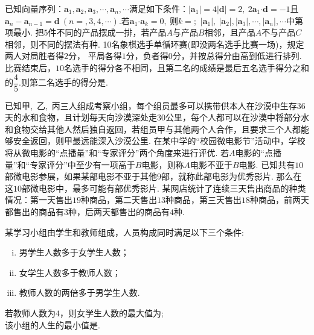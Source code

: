 \documentclass{BHCexam}
\begin{document}
\begin{questions}
\qs 已知向量序列：$ \bm{a}_1,\bm{a}_2,\bm{a}_3,\cdots,\bm{a}_n,\cdots $满足如下条件：$ \left|\bm{a}_1\right|=4\left|\bm{d}\right|=2,~2\bm{a}_1\bm\cdot \bm{d}=-1 $且$ \bm{a}_n-\bm{a}_{n-1}=
\bm{d}~(n=,3,4,\cdots). $若$ \bm{a}_1\bm{\cdot}\bm{a}_k=0,~ $则$ k= $\tk;~$ \left|\bm{a}_1\right|,~  \left|\bm{a}_2\right|, \left|\bm{a}_3\right|,\cdots, \left|\bm{a}_n\right|,\cdots$中第\tk 项最小.
\qs 把$ 5 $件不同的产品摆成一排，若产品$ A $与产品$ B $相邻，且产品$ A $不与产品$ C $相邻，则不同的摆法有\tk 种.
\qs 10名象棋选手单循环赛(即没两名选手比赛一场)，规定两人对局胜者得$ 2 $分， 平局各得$ 1 $分，负者得$ 0 $分，并按总得分由高到低进行排列.比赛结束后，$ 10 $名选手的得分各不相同，且第二名的成绩是最后五名选手得分之和的$ \dfrac{4}{5} $.则第二名选手的得分是\tk. 



\qs 已知甲,~乙,~丙三人组成考察小组，每个组员最多可以携带供本人在沙漠中生存36天的水和食物，且计划每天向沙漠深处走30公里，每个人都可以在沙漠中将部分水和食物交给其他人然后独自返回，若组员甲与其他两个人合作，且要求三个人都能够安全返回，则甲最远能深入沙漠\tk 公里.
\qs 在某中学的“校园微电影节”活动中，学校将从微电影的“点播量”和“专家评分”两个角度来进行评优. 若$A$电影的“点播量”和“专家评分”中至少有一项高于$B$电影，则称$A$电影不亚于$B$电影. 已知共有$10$部微电影参展，如果某部电影不亚于其他$9$部，就称此部电影为优秀影片. 那么在这$10$部微电影中，最多可能有\tk 部优秀影片.
\qs 某网店统计了连续三天售出商品的种类情况：第一天售出$ 19 $种商品，第二天售出$ 13 $种商品，第三天售出$ 18 $种商品，前两天都售出的商品有$ 3 $种，后两天都售出的商品有$ 4 $种.
\qs 某学习小组由学生和教师组成，人员构成同时满足以下三个条件:
\begin{enumerate}[(i)]
\item 男学生人数多于女学生人数；
\item 女学生人数多于教师人数；
\item 教师人数的两倍多于男学生人数.
\end{enumerate}
 若教师人数为$ 4 $，则女学生人数的最大值为\tk;\\
 该小组的人生的最小值是\tk.

\end{questions}
\end{document}
